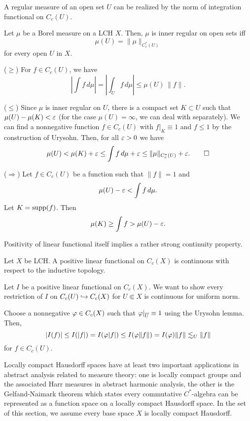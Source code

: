 \documentclass{../note}
\begin{document}
A regular measure of an open set $U$ can be realized by the norm of integration functional on $C_c(U)$.
\begin{lem}
Let $\mu$ be a Borel measure on a LCH $X$.
Then, $\mu$ is inner regular on open sets iff
\[\mu(U)=\|\mu\|_{C_c^*(U)}\]
for every open $U$ in $X$.
\end{lem}
\begin{pf}
($\ge$)
For $f\in C_c(U)$, we have
\[|\int f\,d\mu|=|\int_Uf\,d\mu|\le\mu(U)\,\|f\|.\]

($\le$)
Since $\mu$ is inner regular on $U$, there is a compact set $K\subset U$ such that $\mu(U)-\mu(K)<\varepsilon$ (for the case $\mu(U)=\infty$, we can deal with separately).
We can find a nonnegative function $f\in C_c(U)$ with $f|_K \equiv 1$ and $f\le1$ by the construction of Urysohn.
Then, for all $\varepsilon>0$ we have
\[\mu(U)<\mu(K)+\varepsilon\le\int f\,d\mu+\varepsilon\le\|\mu\|_{C_c^*(U)}+\varepsilon.\qedhere\]

($\Rightarrow$)
Let $f\in C_c(U)$ be a function such that $\|f\|=1$ and
\[\mu(U)-\varepsilon<\int f\,d\mu.\]
Let $K=\operatorname{supp}(f)$.
Then
\[\mu(K)\ge\int f>\mu(U)-\varepsilon.\]
\end{pf}


Positivity of linear functional itself implies a rather strong continuity property.
\begin{thm}
Let $X$ be LCH.
A positive linear functional on $C_c(X)$ is continuous with respect to the inductive topology.
\end{thm}
\begin{pf}
Let $I$ be a positive linear functional on $C_c(X)$.
We want to show every restriction of $I$ on $C_c(U)\hookrightarrow C_c(X)$ for $U\Subset X$ is continuous for uniform norm.

Choose a nonnegative $\varphi\in C_c(X)$ such that $\varphi|_{\overline{U}}\equiv1$ using the Urysohn lemma.
Then,
\[|I(f)|\le I(|f|)=I(\varphi|f|)\le I(\varphi\|f\|)=I(\varphi)\|f\|\lesssim_U\|f\|\]
for $f\in C_c(U)$.
\end{pf}


Locally compact Hausdorff spaces have at least two important applications in abstract analysis related to measure theory: one is locally compact groups and the associated Harr measures in abstract harmonic analysis, the other is the Gelfand-Naimark theorem which states every commutative $C^*$-algebra can be represented as a function space on a locally compact Hausdorff space.
In the set of this section, we assume every base space $X$ is locally compact Hausdorff.
\end{document}
